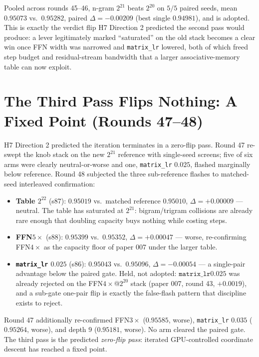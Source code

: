 \documentclass{article}
\begin{document}
Pooled across rounds 45--46, n-gram $2^{21}$ beats $2^{20}$ on $5/5$ paired seeds, mean $0.95073$ vs.\ $0.95282$, paired $\Delta = -0.00209$ (best single $0.94981$), and is adopted. This is exactly the verdict flip H7 Direction 2 predicted the second pass would produce: a lever legitimately marked ``saturated'' on the old stack becomes a clear win once FFN width was narrowed and \texttt{matrix\_lr} lowered, both of which freed step budget and residual-stream bandwidth that a larger associative-memory table can now exploit.

\section{The Third Pass Flips Nothing: A Fixed Point (Rounds 47--48)}
\label{sec:fixedpoint}

H7 Direction 2 predicted the iteration terminates in a zero-flip pass. Round 47 re-swept the knob stack on the new $2^{21}$ reference with single-seed screens; five of six arms were clearly neutral-or-worse and one, \texttt{matrix\_lr} $0.025$, flashed marginally below reference. Round 48 subjected the three sub-reference flashes to matched-seed interleaved confirmation:

\begin{itemize}
    \item \textbf{Table $2^{22}$} (s87): $0.95019$ vs.\ matched reference $0.95010$, $\Delta = +0.00009$ --- neutral. The table has saturated at $2^{21}$: bigram/trigram collisions are already rare enough that doubling capacity buys nothing while costing steps.
    \item \textbf{FFN$5\times$} (s88): $0.95399$ vs.\ $0.95352$, $\Delta = +0.00047$ --- worse, re-confirming FFN$4\times$ as the capacity floor of paper 007 under the larger table.
    \item \textbf{\texttt{matrix\_lr} $0.025$} (s86): $0.95043$ vs.\ $0.95096$, $\Delta = -0.00054$ --- a single-pair advantage below the paired gate. Held, not adopted: $\texttt{matrix\_lr} 0.025$ was already rejected on the FFN$4\times$@$2^{20}$ stack (paper 007, round 43, $+0.0019$), and a sub-gate one-pair flip is exactly the false-flash pattern that discipline exists to reject.
\end{itemize}

Round 47 additionally re-confirmed FFN$3\times$ ($0.95585$, worse), \texttt{matrix\_lr} $0.035$ ($0.95264$, worse), and depth 9 ($0.95181$, worse). No arm cleared the paired gate. The third pass is the predicted \emph{zero-flip pass}: iterated GPU-controlled coordinate descent has reached a fixed point.
\end{document}
